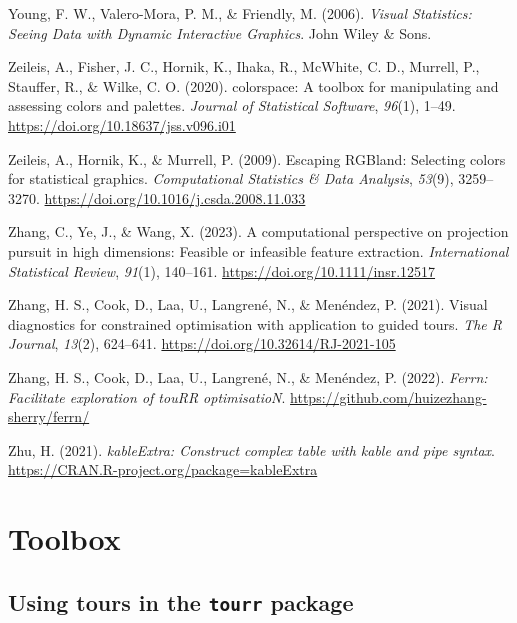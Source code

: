 \documentclass[
  letterpaper,
]{krantz}
\newlength{\cslhangindent}
\newenvironment{CSLReferences}[2] %
 {\begin{list}{}{%
  \setlength{\itemindent}{0pt}
  \setlength{\leftmargin}{0pt}
  \setlength{\parsep}{0pt}
  \ifodd #1
   \setlength{\leftmargin}{\cslhangindent}
   \setlength{\itemindent}{-1\cslhangindent}
  \fi
  \setlength{\itemsep}{#2\baselineskip}}}
 {\end{list}}
\begin{document}
\begin{CSLReferences}{1}{0}
Young, F. W., Valero-Mora, P. M., \& Friendly, M. (2006). \emph{Visual
{S}tatistics: {S}eeing {D}ata with {D}ynamic {I}nteractive {G}raphics}.
John Wiley \& Sons.

Zeileis, A., Fisher, J. C., Hornik, K., Ihaka, R., McWhite, C. D.,
Murrell, P., Stauffer, R., \& Wilke, C. O. (2020). {colorspace}: A
toolbox for manipulating and assessing colors and palettes.
\emph{Journal of Statistical Software}, \emph{96}(1), 1--49.
\url{https://doi.org/10.18637/jss.v096.i01}

Zeileis, A., Hornik, K., \& Murrell, P. (2009). Escaping {RGB}land:
Selecting colors for statistical graphics. \emph{Computational
Statistics \& Data Analysis}, \emph{53}(9), 3259--3270.
\url{https://doi.org/10.1016/j.csda.2008.11.033}

Zhang, C., Ye, J., \& Wang, X. (2023). A computational perspective on
projection pursuit in high dimensions: Feasible or infeasible feature
extraction. \emph{International Statistical Review}, \emph{91}(1),
140--161. \url{https://doi.org/10.1111/insr.12517}

Zhang, H. S., Cook, D., Laa, U., Langrené, N., \& Menéndez, P. (2021).
Visual diagnostics for constrained optimisation with application to
guided tours. \emph{The R Journal}, \emph{13}(2), 624--641.
\url{https://doi.org/10.32614/RJ-2021-105}

Zhang, H. S., Cook, D., Laa, U., Langrené, N., \& Menéndez, P. (2022).
\emph{Ferrn: Facilitate exploration of touRR optimisatioN}.
\url{https://github.com/huizezhang-sherry/ferrn/}

Zhu, H. (2021). \emph{kableExtra: Construct complex table with kable and
pipe syntax}. \url{https://CRAN.R-project.org/package=kableExtra}

\end{CSLReferences}

\cleardoublepage
{}
{}
\appendix

\chapter{Toolbox}\label{toolbox}

\section{\texorpdfstring{Using tours in the \texttt{tourr}
package}{Using tours in the tourr package}}\label{using-tours-in-the-tourr-package}
\end{document}
